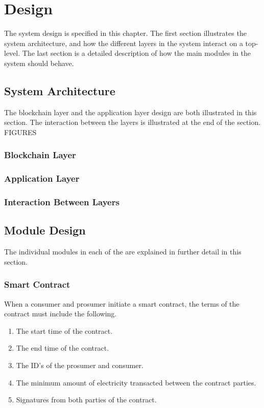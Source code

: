 \chapter{Design}
The system design is specified in this chapter. The first section illustrates the system architecture, and how the different layers in the system interact on a top-level. The last section is a detailed description of how the main modules in the system should behave.
\section{System Architecture}
The blockchain layer and the application layer design are both illustrated in this section. The interaction between the layers is illustrated at the end of the section.
FIGURES
\subsection{Blockchain Layer}
\subsection{Application Layer}
\subsection{Interaction Between Layers}

\section{Module Design}
The individual modules in each of the are explained in further detail in this section.
\subsection{Smart Contract}
When a consumer and prosumer initiate a smart contract, the terms of the contract must include the following.
\begin{enumerate}
\item The start time of the contract.
\item The end time of the contract.
\item The ID's of the prosumer and consumer.
\item The minimum amount of electricity transacted between the contract parties.
\item Signatures from both parties of the contract.
\end{enumerate}

